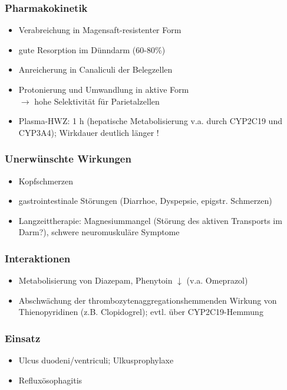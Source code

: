 \documentclass[10pt,a4paper]{report}
\begin{document}
\subsubsection{Pharmakokinetik} %
\label{ssub:pharmakokinetik}
\begin{itemize}
	\item Verabreichung in Magensaft-resistenter Form
	\item gute Resorption im Dünndarm (60-80\%)
	\item Anreicherung in Canaliculi der Belegzellen
	\item Protonierung und Umwandlung in aktive Form\\
	$\rightarrow$ hohe Selektivität für Parietalzellen
	\item Plasma-HWZ: 1 h (hepatische Metabolisierung v.a. durch CYP2C19 und CYP3A4); Wirkdauer deutlich länger !
\end{itemize}
\subsubsection{Unerwünschte Wirkungen} %
\label{ssub:unerw_nschte_wirkungen}
\begin{itemize}
	\item Kopfschmerzen
	\item gastrointestinale Störungen (Diarrhoe, Dyspepsie, epigstr. Schmerzen)
	\item Langzeittherapie: Magnesiummangel (Störung des aktiven Transports im 	Darm?), schwere neuromuskuläre Symptome
\end{itemize}
\subsubsection{Interaktionen} %
\label{ssub:interaktionen}
\begin{itemize}
	\item Metabolisierung von Diazepam, Phenytoin $\downarrow$ (v.a. Omeprazol)
	\item Abschwächung der thrombozytenaggregationshemmenden Wirkung von 	Thienopyridinen (z.B. Clopidogrel); evtl. über CYP2C19-Hemmung
\end{itemize}
\subsubsection{Einsatz} %
\label{ssub:einsatz}
\begin{itemize}
	\item Ulcus duodeni/ventriculi; Ulkusprophylaxe
	\item Refluxösophagitis
\end{itemize}
\end{document}
